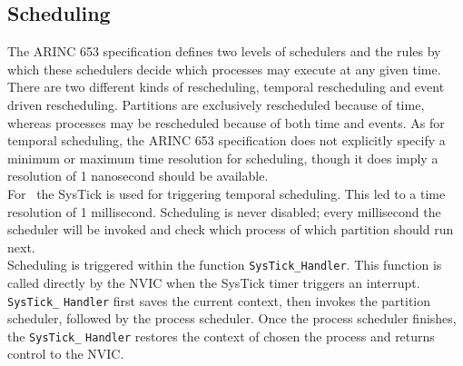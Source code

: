 \subsection{Scheduling}
The ARINC 653 specification defines two levels of schedulers and the rules by
which these schedulers decide which processes may execute at any given time.
There are two different kinds of rescheduling, temporal rescheduling and event
driven rescheduling. Partitions are exclusively rescheduled because of time,
whereas processes may be rescheduled because of both time and events.
As for temporal scheduling, the ARINC 653 specification does not explicitly
specify a minimum or maximum time resolution for scheduling, though it does
imply a resolution of 1 nanosecond should be available\cite{arinc_time}.\\

For \OSname\ the SysTick is used for triggering temporal scheduling. This
led to a time resolution of 1 millisecond. Scheduling is
never disabled; every millisecond the scheduler will be invoked and check which
process of which partition should run next.\\

%

Scheduling is triggered within the function \texttt{SysTick\_Handler}. This
function is called directly by the NVIC when the SysTick timer triggers an
interrupt. \texttt{SysTick\_} \texttt{Handler} first saves the current
context, then invokes the partition scheduler, followed by the process scheduler.
Once the process scheduler finishes, the \texttt{SysTick\_} \texttt{Handler}
restores the context of chosen the process and returns control to the NVIC.


